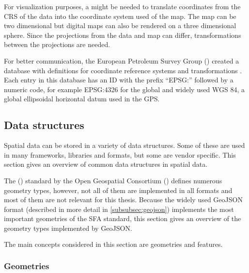 		For visualization purposes, a  might be needed to translate coordinates from the CRS of the data into the coordinate system used of the map.
		The map can be two dimensional but digital maps can also be rendered on a three dimensional sphere.
		Since the projections from the data and map can differ, transformations between the projections are needed.
		
		For better communication, the European Petroleum Survey Group () created a database with definitions for coordinate reference systems and transformations \cite{epsg}.
		Each entry in this database has an ID with the prefix \enquote{EPSG:} followed by a numeric code, for example EPSG:4326 for the global and widely used WGS 84, a global ellipsoidal horizontal datum used in the GPS.
		
	\subsection{Data structures}
	\label{subsec:data-structures}
	
		Spatial data can be stored in a variety of data structures.
		Some of these are used in many frameworks, libraries and formats, but some are vendor specific.
		This section gives an overview of common data structures in spatial data.
		
		The  () standard by the Open Geospatial Consortium () defines numerous geometry types\cite{ogc-sfa}, however, not all of them are implemented in all formats and most of them are not relevant for this thesis.
		Because the widely used GeoJSON format (described in more detail in \cref{subsubsec:geojson}) implements the most important geometries of the SFA standard\cite{ietf-geojson}, this section gives an overview of the geometry types implemented by GeoJSON.
		
		The main concepts considered in this section are geometries and features.
		
		\subsubsection{Geometries}
		

